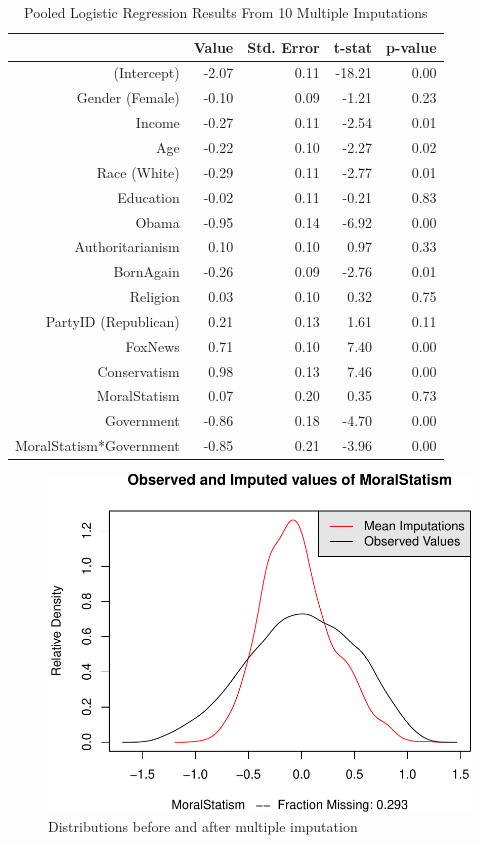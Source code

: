 \documentclass[12pt,]{article}
\begin{document}
\clearpage

\begin{table}[ht]
\centering
\begin{tabular}{rrrrr}
  \hline
 & Value & Std. Error & t-stat & p-value \\ 
  \hline
(Intercept) & -2.07 & 0.11 & -18.21 & 0.00 \\ 
  Gender (Female) & -0.10 & 0.09 & -1.21 & 0.23 \\ 
  Income & -0.27 & 0.11 & -2.54 & 0.01 \\ 
  Age & -0.22 & 0.10 & -2.27 & 0.02 \\ 
  Race (White) & -0.29 & 0.11 & -2.77 & 0.01 \\ 
  Education & -0.02 & 0.11 & -0.21 & 0.83 \\ 
  Obama & -0.95 & 0.14 & -6.92 & 0.00 \\ 
  Authoritarianism & 0.10 & 0.10 & 0.97 & 0.33 \\ 
  BornAgain & -0.26 & 0.09 & -2.76 & 0.01 \\ 
  Religion & 0.03 & 0.10 & 0.32 & 0.75 \\ 
  PartyID (Republican) & 0.21 & 0.13 & 1.61 & 0.11 \\ 
  FoxNews & 0.71 & 0.10 & 7.40 & 0.00 \\ 
  Conservatism & 0.98 & 0.13 & 7.46 & 0.00 \\ 
  MoralStatism & 0.07 & 0.20 & 0.35 & 0.73 \\ 
  Government & -0.86 & 0.18 & -4.70 & 0.00 \\ 
  MoralStatism*Government & -0.85 & 0.21 & -3.96 & 0.00 \\ 
   \hline
\end{tabular}
\caption{Pooled Logistic Regression Results From 10 Multiple Imputations} 
\end{table}

\clearpage

\begin{figure}[htbp]
\centering
\includegraphics{figures/missing2-1.pdf}
\caption{Distributions before and after multiple imputation}
\end{figure}
\end{document}
